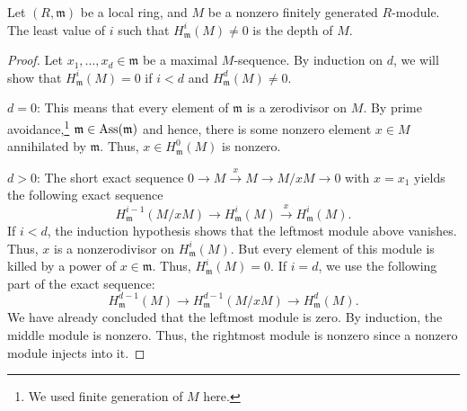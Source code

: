 \documentclass[12pt]{article}
\begin{document}
\begin{thm}
	Let $(R, \mathfrak{m})$ be a local ring, and $M$ be a nonzero finitely generated $R$-module. The least value of $i$ such that $H_{\mathfrak{m}}^{i}(M) \neq 0$ is the depth of $M$.
\end{thm}
\begin{proof} 
	Let $x_{1}, \ldots, x_{d} \in \mathfrak{m}$ be a maximal $M$-sequence. By induction on $d$, we will show that $H_{\mathfrak{m}}^{i}(M) = 0$ if $i < d$ and $H_{\mathfrak{m}}^{d}(M) \neq 0$.

	$d = 0$: This means that every element of $\mathfrak{m}$ is a zerodivisor on $M$. By prime avoidance,\footnote{We used finite generation of $M$ here.} $\mathfrak{m} \in \operatorname{Ass}(\mathfrak{m})$ and hence, there is some nonzero element $x \in M$ annihilated by $\mathfrak{m}$. Thus, $x \in H_{\mathfrak{m}}^{0}(M)$ is nonzero.

	$d > 0$: The short exact sequence $0 \to M \xrightarrow{x} M \to M/x M \to 0$ with $x = x_{1}$ yields the following exact sequence
	\begin{equation*} 
		H_{\mathfrak{m}}^{i - 1}(M/xM) \to H_{\mathfrak{m}}^{i}(M) \xrightarrow{x} H_{\mathfrak{m}}^{i}(M).
	\end{equation*}
	If $i < d$, the induction hypothesis shows that the leftmost module above vanishes. Thus, $x$ is a nonzerodivisor on $H_{\mathfrak{m}}^{i}(M)$. But every element of this module is killed by a power of $x \in \mathfrak{m}$. Thus, $H_{\mathfrak{m}}^{i}(M) = 0$. \newline
	If $i = d$, we use the following part of the exact sequence:
	\begin{equation*} 
		H_{\mathfrak{m}}^{d - 1}(M) \to H_{\mathfrak{m}}^{d - 1}(M/xM) \to H_{\mathfrak{m}}^{d}(M).
	\end{equation*}
	We have already concluded that the leftmost module is zero. By induction, the middle module is nonzero. Thus, the rightmost module is nonzero since a nonzero module injects into it.
\end{proof}
\end{document}
